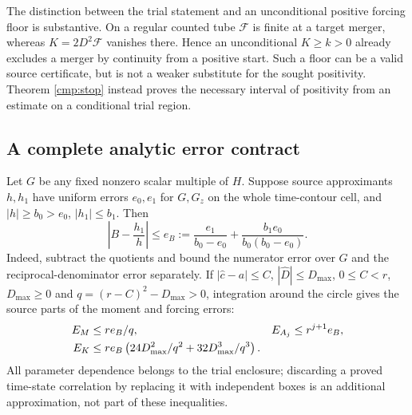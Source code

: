 The distinction between the trial statement and an unconditional positive
forcing floor is substantive. On a regular counted tube $\mathcal F$
is finite at a target merger, whereas $K=2D^2\mathcal F$ vanishes there.
Hence an unconditional $K\ge k>0$ already excludes a merger by continuity
from a positive start. Such a floor can be a valid source certificate,
but is not a weaker substitute for the sought positivity. Theorem
\ref{cmp:stop} instead proves the necessary interval of positivity from
an estimate on a conditional trial region.

\subsection{A complete analytic error contract}

Let $G$ be any fixed nonzero scalar multiple of $H$. Suppose source
approximants $h,h_1$ have uniform errors $e_0,e_1$ for $G,G_z$ on the
whole time-contour cell, and $|h|\ge b_0>e_0$, $|h_1|\le b_1$. Then
\begin{equation}
 \left|B-\frac{h_1}{h}\right|
 \le e_B:=\frac{e_1}{b_0-e_0}
          +\frac{b_1e_0}{b_0(b_0-e_0)}.
 \label{cmp:quotient-error}
\end{equation}
Indeed, subtract the quotients and bound the numerator error over $G$
and the reciprocal-denominator error separately. If
$|\widehat c-a|\le C$, $|\widehat D|\le D_{\max}$,
$0\le C<r$, $D_{\max}\ge0$ and
$q=(r-C)^2-D_{\max}>0$, integration around the circle gives the source
parts of the moment and forcing errors:
\begin{align}
 E_M&\le re_B/q,&
 E_{A_j}&\le r^{j+1}e_B,\notag\\
 E_K&\le re_B\left(24D_{\max}^2/q^2+32D_{\max}^3/q^3\right).
 \label{cmp:kernel-errors}
\end{align}
All parameter dependence belongs to the trial enclosure; discarding a
proved time-state correlation by replacing it with independent boxes is
an additional approximation, not part of these inequalities.


